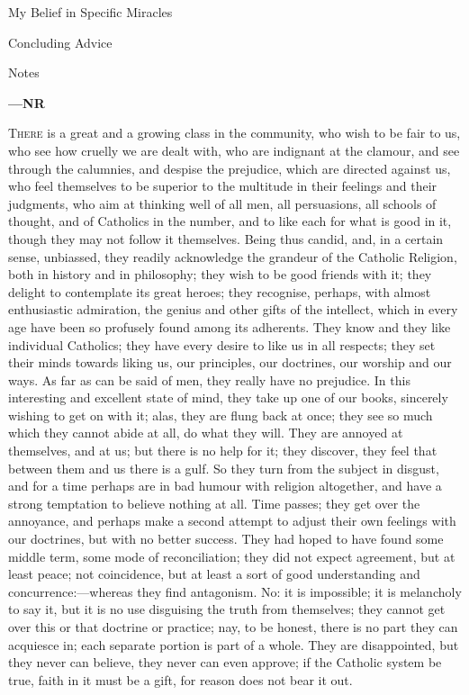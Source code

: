 My Belief in
Specific Miracles

Concluding Advice

Notes

\textbf{—NR}

T\textsc{here} is a great and a growing class in the community,
who wish to be fair to us, who see how cruelly we are
dealt with, who are indignant at the clamour, and see
through the calumnies, and despise the prejudice, which
are directed against us, who feel themselves to be
superior to the multitude in their feelings and their
judgments, who aim at thinking well of all men, all
persuasions, all schools of thought, and of Catholics in
the number, and to like each for what is good in it,
though they may not follow it themselves. Being thus
candid, and, in a certain sense, unbiassed, they readily
acknowledge the grandeur of the Catholic Religion, both
in history and in philosophy; they wish to be good
friends with it; they delight to contemplate its great
heroes; they recognise, perhaps, with almost enthusiastic
admiration, the genius and other gifts of the intellect,
which in every age have been so profusely found among its
adherents. They know and they like individual Catholics;
they have every desire to like us in all respects; they
set their minds towards liking us, our principles, our
doctrines, our worship and our ways. As far as can be
said of men, they really have no prejudice. In this
interesting and excellent state of mind, they take up one
of our books, sincerely wishing to get on with it; alas,
they are flung back at once; they see so much which they
cannot abide at all, do what they will. They are annoyed
at themselves, and at us; but there is no help for it;
they discover, they feel that between them and us there
is a gulf. So they turn from the subject in disgust, and
for a time perhaps are in bad humour with religion
altogether, and have a strong temptation to believe
nothing at all. Time passes; they get over the annoyance,
and perhaps make a second attempt to adjust their own
feelings with our doctrines, but with no better success.
They had hoped to have found some middle term, some mode
of reconciliation; they did not expect agreement, but at
least peace; not coincidence, but at least a sort of good
understanding and concurrence:—whereas they find
antagonism. No: it is impossible; it is melancholy to say
it, but it is no use disguising the truth from
themselves; they cannot get over this or that doctrine or
practice; nay, to be honest, there is no part they can
acquiesce in; each separate portion is part of a whole.
They are disappointed, but they never can believe, they
never can even approve; if the Catholic system be true,
faith in it must be a gift, for reason does not bear it
out.

